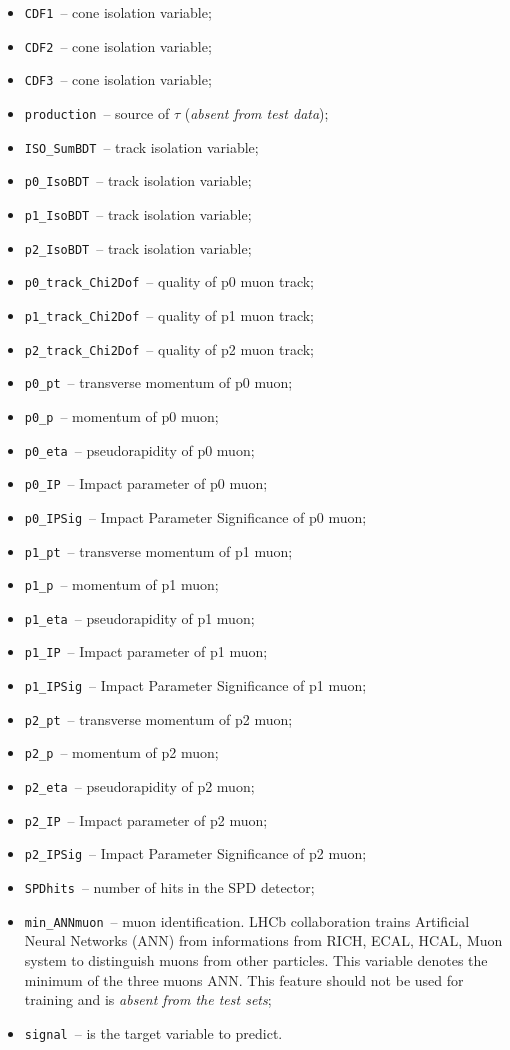 \documentclass[conference]{IEEEtran}
\begin{document}
\begin{itemize}
	\item \texttt{CDF1}~-- cone isolation variable;
	\item \texttt{CDF2}~-- cone isolation variable;
	\item \texttt{CDF3}~-- cone isolation variable;
	\item \texttt{production}~-- source of $\tau$ (\textit{absent from test data});
	\item \texttt{ISO\_SumBDT}~-- track isolation variable;
	\item \texttt{p0\_IsoBDT}~-- track isolation variable;
	\item \texttt{p1\_IsoBDT}~-- track isolation variable;
	\item \texttt{p2\_IsoBDT}~-- track isolation variable;
	\item \texttt{p0\_track\_Chi2Dof}~-- quality of p0 muon track;
	\item \texttt{p1\_track\_Chi2Dof}~-- quality of p1 muon track;
	\item \texttt{p2\_track\_Chi2Dof}~-- quality of p2 muon track;
	\item \texttt{p0\_pt}~-- transverse momentum of p0 muon;
	\item \texttt{p0\_p}~-- momentum of p0 muon;
	\item \texttt{p0\_eta}~-- pseudorapidity of p0 muon;
	\item \texttt{p0\_IP}~-- Impact parameter of p0 muon;
	\item \texttt{p0\_IPSig}~-- Impact Parameter Significance of p0 muon;
	\item \texttt{p1\_pt}~-- transverse momentum of p1 muon;
	\item \texttt{p1\_p}~-- momentum of p1 muon;
	\item \texttt{p1\_eta}~-- pseudorapidity of p1 muon;
	\item \texttt{p1\_IP}~-- Impact parameter of p1 muon;
	\item \texttt{p1\_IPSig}~-- Impact Parameter Significance of p1 muon;
	\item \texttt{p2\_pt}~-- transverse momentum of p2 muon;
	\item \texttt{p2\_p}~-- momentum of p2 muon;
	\item \texttt{p2\_eta}~-- pseudorapidity of p2 muon;
	\item \texttt{p2\_IP}~-- Impact parameter of p2 muon;
	\item \texttt{p2\_IPSig}~-- Impact Parameter Significance of p2 muon;
	\item \texttt{SPDhits}~-- number of hits in the SPD detector;
	\item \texttt{min\_ANNmuon}~-- muon identification. LHCb collaboration trains
  	Artificial Neural Networks (ANN) from informations from RICH, ECAL,
  	HCAL, Muon system to distinguish muons from other particles. This
  	variable denotes the minimum of the three muons ANN. This feature
  	should not be used for training and is \textit{absent from the test
		sets};
	\item \texttt{signal}~-- is the target variable to predict.
\end{itemize}

\end{document}
